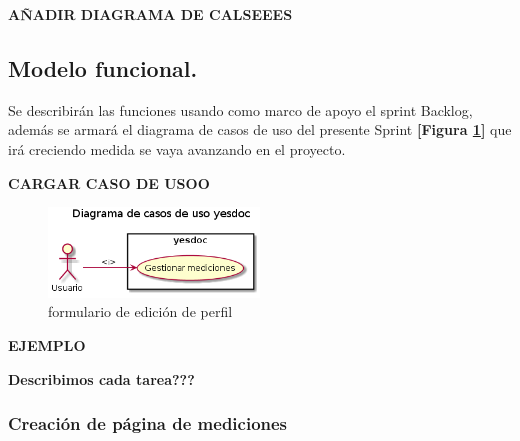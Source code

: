 \documentclass[a4paper,12pt]{article}
\begin{document}
\textbf{AÑADIR DIAGRAMA DE CALSEEES}


\subsection{ Modelo funcional.} %
Se describirán las funciones usando como marco de apoyo el sprint Backlog, además se armará el diagrama de casos de uso del presente Sprint \textbf{[Figura \ref{2-caso_de_uso}]} que irá creciendo  medida se vaya avanzando en el proyecto.


\textbf{CARGAR CASO DE USOO}
    \begin{figure}[h]
        \centering
        \includegraphics[width=0.5\textwidth]{img/2-caso_de_uso}
        \caption{formulario de edición de perfil}
		\label{2-caso_de_uso}
    \end{figure}


\textbf{EJEMPLO}
	{\scriptsize
	\begin{center} %
	\centering
    	\end{center}
	}
    
    \textbf{Describimos cada tarea???}
\subsubsection{Creación de página de mediciones}
\end{document}

